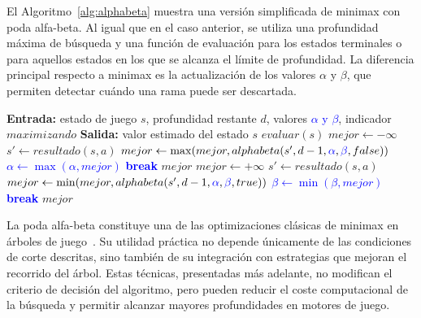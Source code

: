El Algoritmo~\ref{alg:alphabeta} muestra una versión simplificada de minimax con poda alfa-beta. Al igual que en el caso anterior, se utiliza una profundidad máxima de búsqueda y una función de evaluación para los estados terminales o para aquellos estados en los que se alcanza el límite de profundidad. La diferencia principal respecto a minimax es la actualización de los valores $\alpha$ y $\beta$, que permiten detectar cuándo una rama puede ser descartada.

\begin{algorithm}[H]
\caption{Minimax con poda alfa-beta}
\label{alg:alphabeta}
\begin{algorithmic}[1]
\State \textbf{Entrada:} estado de juego $s$, profundidad restante $d$, valores \textcolor{blue}{$\alpha$ y $\beta$}, indicador $maximizando$
\State \textbf{Salida:} valor estimado del estado $s$
    \State \Return $evaluar(s)$
\EndIf
{}
    \State $mejor \gets -\infty$
        \State $s' \gets resultado(s, a)$
        \State $mejor \gets \max(mejor, alphabeta(s', d - 1, \textcolor{blue}{\alpha}, \textcolor{blue}{\beta}, false))$
        \State \textcolor{blue}{$\alpha \gets \max(\alpha, mejor)$}
        \If{\textcolor{blue}{$\alpha \geq \beta$}}
            \State \textcolor{blue}{\textbf{break}}
        \EndIf
    \EndFor
    \State \Return $mejor$
\Else
    \State $mejor \gets +\infty$
        \State $s' \gets resultado(s, a)$
        \State $mejor \gets \min(mejor, alphabeta(s', d - 1, \textcolor{blue}{\alpha}, \textcolor{blue}{\beta}, true))$
        \State \textcolor{blue}{$\beta \gets \min(\beta, mejor)$}
        \If{\textcolor{blue}{$\alpha \geq \beta$}}
            \State \textcolor{blue}{\textbf{break}}
        \EndIf
    \EndFor
    \State \Return $mejor$
\EndIf
\end{algorithmic}
\end{algorithm}

La poda alfa-beta constituye una de las optimizaciones clásicas de minimax en árboles de juego~\cite{knuth1975alphabeta}. Su utilidad práctica no depende únicamente de las condiciones de corte descritas, sino también de su integración con estrategias que mejoran el recorrido del árbol. Estas técnicas, presentadas más adelante, no modifican el criterio de decisión del algoritmo, pero pueden reducir el coste computacional de la búsqueda y permitir alcanzar mayores profundidades en motores de juego.


